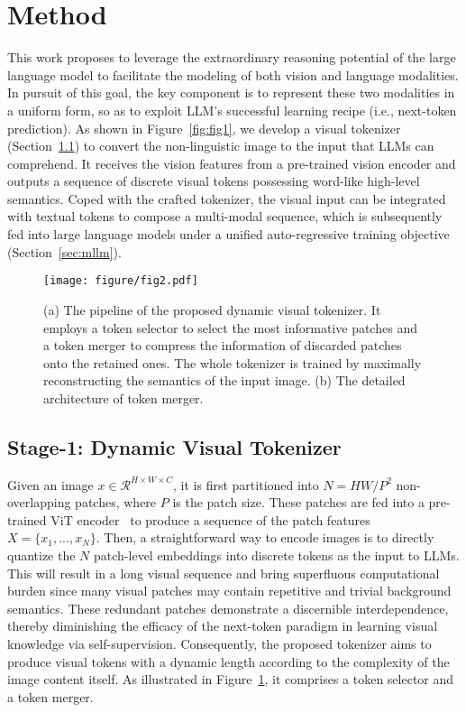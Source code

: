\section{Method}
This work proposes to leverage the extraordinary reasoning potential of the large language model to facilitate the modeling of both vision and language modalities. In pursuit of this goal, the key component is to represent these two modalities in a uniform form, so as to exploit LLM's successful learning recipe (i.e., next-token prediction). As shown in Figure~\ref{fig:fig1}, we develop a visual tokenizer (Section~\ref{sec:tokenizer}) to convert the non-linguistic image to the input that LLMs can comprehend. It receives the vision features from a pre-trained vision encoder and outputs a sequence of discrete visual tokens possessing word-like high-level semantics. Coped with the crafted tokenizer, the visual input can be integrated with textual tokens to compose a multi-modal sequence, which is subsequently fed into large language models under a unified auto-regressive training objective (Section~\ref{sec:mllm}). 

\begin{figure}[t]
\begin{center}
\texttt{[image: figure/fig2.pdf]}
\end{center}
  \caption{(a) The pipeline of the proposed dynamic visual tokenizer. It employs a token selector to select the most informative patches and a token merger to compress the information of discarded patches onto the retained ones. The whole tokenizer is trained by maximally reconstructing the semantics of the input image. (b) The detailed architecture of token merger.}
\label{fig:fig2}
\vspace{-0.1in}
\end{figure}

\subsection{Stage-1: Dynamic Visual Tokenizer}
\label{sec:tokenizer}
Given an image $x \in \mathcal{R}^{H\times W \times C}$, it is first partitioned into $N=HW/P^2$ non-overlapping patches, where $P$ is the patch size. These patches are fed into a pre-trained ViT encoder~\citep{fang2023eva} to produce a sequence of the patch features $X=\{ x_1, ..., x_N \}$. Then, a straightforward way to encode images is to directly quantize the $N$ patch-level embeddings into discrete tokens as the input to LLMs. This will result in a long visual sequence and bring superfluous computational burden since many visual patches may contain repetitive and trivial background semantics. These redundant patches demonstrate a discernible interdependence, thereby diminishing the efficacy of the next-token paradigm in learning visual knowledge via self-supervision. Consequently, the proposed tokenizer aims to produce visual tokens with a dynamic length according to the complexity of the image content itself. As illustrated in Figure~\ref{fig:fig2}, it comprises a token selector and a token merger. 

